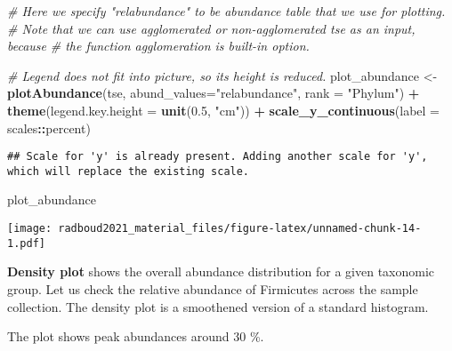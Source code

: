 \documentclass[
  oneside]{book}
\newenvironment{Shaded}{\begin{snugshade}}{\end{snugshade}}
\newcommand{\CommentTok}[1]{\textcolor[rgb]{0.56,0.35,0.01}{\textit{#1}}}
\newcommand{\DataTypeTok}[1]{\textcolor[rgb]{0.13,0.29,0.53}{#1}}
\newcommand{\FloatTok}[1]{\textcolor[rgb]{0.00,0.00,0.81}{#1}}
\newcommand{\KeywordTok}[1]{\textcolor[rgb]{0.13,0.29,0.53}{\textbf{#1}}}
\newcommand{\NormalTok}[1]{#1}
\newcommand{\OperatorTok}[1]{\textcolor[rgb]{0.81,0.36,0.00}{\textbf{#1}}}
\newcommand{\StringTok}[1]{\textcolor[rgb]{0.31,0.60,0.02}{#1}}
\begin{document}
\begin{Shaded}
\begin{Highlighting}[]
\CommentTok{# Here we specify "relabundance" to be abundance table that we use for plotting.}
\CommentTok{# Note that we can use agglomerated or non-agglomerated tse as an input, because}
\CommentTok{# the function agglomeration is built-in option. }

\CommentTok{# Legend does not fit into picture, so its height is reduced.}
\NormalTok{plot_abundance <-}\StringTok{ }\KeywordTok{plotAbundance}\NormalTok{(tse, }\DataTypeTok{abund_values=}\StringTok{"relabundance"}\NormalTok{, }\DataTypeTok{rank =} \StringTok{"Phylum"}\NormalTok{) }\OperatorTok{+}
\StringTok{  }\KeywordTok{theme}\NormalTok{(}\DataTypeTok{legend.key.height =} \KeywordTok{unit}\NormalTok{(}\FloatTok{0.5}\NormalTok{, }\StringTok{"cm"}\NormalTok{)) }\OperatorTok{+}
\StringTok{  }\KeywordTok{scale_y_continuous}\NormalTok{(}\DataTypeTok{label =}\NormalTok{ scales}\OperatorTok{::}\NormalTok{percent)}
\end{Highlighting}
\end{Shaded}

\begin{verbatim}
## Scale for 'y' is already present. Adding another scale for 'y', which will replace the existing scale.
\end{verbatim}

\begin{Shaded}
\begin{Highlighting}[]
\NormalTok{plot_abundance }
\end{Highlighting}
\end{Shaded}

\texttt{[image: radboud2021\_material\_files/figure-latex/unnamed-chunk-14-1.pdf]}

\textbf{Density plot} shows the overall abundance distribution for a given
taxonomic group. Let us check the relative abundance of Firmicutes
across the sample collection. The density plot is a smoothened
version of a standard histogram.

The plot shows peak abundances around 30 \%.
\end{document}
